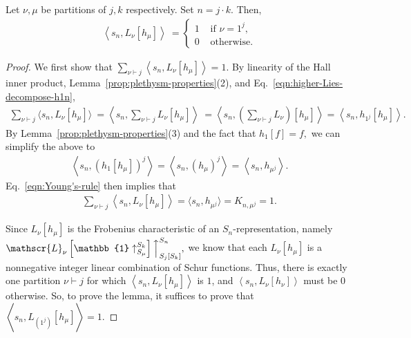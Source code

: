 \documentclass[ALCO, Unicode]{cedram}
\begin{document}
\begin{lemma} \label{lem: mult-of-triv}
Let $\nu, \mu$ be partitions of $j, k$ respectively. Set $n = j\cdot k.$ Then,
\begin{align*}
   \left  \langle s_n, L_{\nu}[h_\mu]\right  \rangle \  = \begin{cases}
    1 &\text{ if $\nu = 1^{j}$},\\
    0 &\text{ otherwise.}
    \end{cases}
\end{align*}
\end{lemma}
\begin{proof} 
We first show that $\sum_{\nu \vdash j}\left \langle s_n, L_{\nu}[h_\mu] \right \rangle = 1.$  By linearity of the Hall inner product, Lemma~\ref{prop:plethysm-properties}(2), and Eq.~\eqref{eqn:higher-Lies-decompose-h1n},
\begin{align*}
    \sum_{\nu \vdash j}\langle s_n, L_{\nu}[h_\mu] \rangle \  = \left \langle s_n, \sum_{\nu \vdash j} L_{\nu}[h_\mu] \right \rangle \ = \left \langle s_n, \left(\sum_{\nu \vdash j} L_{\nu}\right)[h_\mu] \right \rangle = \left \langle s_n, h_{1^j}[h_\mu]\right \rangle. 
\end{align*}
By Lemma~\ref{prop:plethysm-properties}(3) and the fact that $h_1[f] = f,$ we can simplify the above to 
\begin{align*}
\left \langle s_n, \left(h_1[h_\mu]\right)^j\right \rangle = \left \langle s_n, \left(h_\mu\right)^j\right \rangle=\left \langle s_n, h_{\mu^j} \right \rangle.
\end{align*}
Eq.~\eqref{eqn:Young's-rule} then implies that 
\begin{align*}
    \sum_{\nu \vdash j} \left\langle s_n, L_{\nu}[h_\mu] \right\rangle = \langle s_n, h_{\mu^j}\rangle  = K_{n, \mu^j} = 1.
\end{align*}

Since $L_\nu[h_\mu]$ is the Frobenius characteristic of an $S_n$-representation, namely $\mathscr{L}_\nu\left[\mathbb{1} \uparrow_{S_\mu}^{S_k}\right] \Big \uparrow_{S_{j}[S_k]}^{S_n},$  we know that each $L_\nu[h_\mu]$ is a nonnegative integer linear combination of Schur functions. Thus, there is exactly one partition $\nu \vdash j$ for which $\left \langle s_n,L_\nu[h_\mu] \right \rangle$ is $1$, and $\left \langle s_n,L_\nu[h_\nu] \right \rangle$ must be $0$ otherwise. So, to prove the lemma, it suffices to prove that $\left\langle s_n, L_{(1^j)}[h_\mu] \right \rangle = 1$.


\end{proof}
\end{document}
